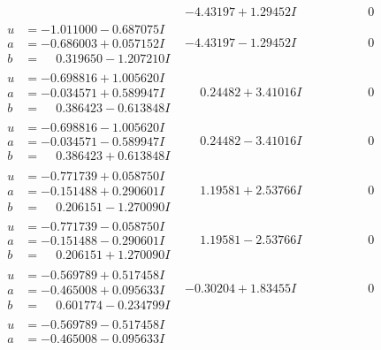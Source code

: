 \documentclass[1p]{elsarticle_modified}
\theoremstyle{definition}
\begin{document}
$$\begin{array}{c|c|c}
 & -4.43197 + 1.29452 I & \phantom{-0.000000 } 0 \\ \hline\begin{aligned}
u &= -1.011000 - 0.687075 I \\
a &= -0.686003 + 0.057152 I \\
b &= \phantom{-}0.319650 - 1.207210 I\end{aligned}
 & -4.43197 - 1.29452 I & \phantom{-0.000000 } 0 \\ \hline\begin{aligned}
u &= -0.698816 + 1.005620 I \\
a &= -0.034571 + 0.589947 I \\
b &= \phantom{-}0.386423 - 0.613848 I\end{aligned}
 & \phantom{-}0.24482 + 3.41016 I & \phantom{-0.000000 } 0 \\ \hline\begin{aligned}
u &= -0.698816 - 1.005620 I \\
a &= -0.034571 - 0.589947 I \\
b &= \phantom{-}0.386423 + 0.613848 I\end{aligned}
 & \phantom{-}0.24482 - 3.41016 I & \phantom{-0.000000 } 0 \\ \hline\begin{aligned}
u &= -0.771739 + 0.058750 I \\
a &= -0.151488 + 0.290601 I \\
b &= \phantom{-}0.206151 - 1.270090 I\end{aligned}
 & \phantom{-}1.19581 + 2.53766 I & \phantom{-0.000000 } 0 \\ \hline\begin{aligned}
u &= -0.771739 - 0.058750 I \\
a &= -0.151488 - 0.290601 I \\
b &= \phantom{-}0.206151 + 1.270090 I\end{aligned}
 & \phantom{-}1.19581 - 2.53766 I & \phantom{-0.000000 } 0 \\ \hline\begin{aligned}
u &= -0.569789 + 0.517458 I \\
a &= -0.465008 + 0.095633 I \\
b &= \phantom{-}0.601774 - 0.234799 I\end{aligned}
 & -0.30204 + 1.83455 I & \phantom{-0.000000 } 0 \\ \hline\begin{aligned}
u &= -0.569789 - 0.517458 I \\
a &= -0.465008 - 0.095633 I \\

\end{aligned}
\end{array}$$
\end{document}
